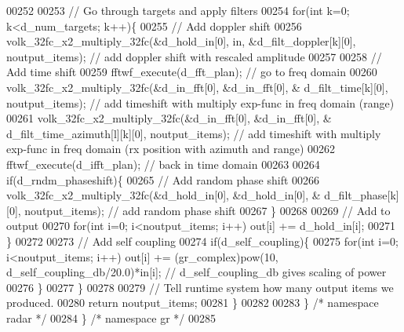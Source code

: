 \begin{DoxyCode}
00252 
00253             \textcolor{comment}{// Go through targets and apply filters}
00254             \textcolor{keywordflow}{for}(\textcolor{keywordtype}{int} k=0; k<d_num_targets; k++)\{
00255                 \textcolor{comment}{// Add doppler shift}
00256                 volk\_32fc\_x2\_multiply\_32fc(&d_hold_in[0], in, &d_filt_doppler[k][0], noutput\_items); \textcolor{comment}{// add
       doppler shift with rescaled amplitude}
00257 
00258                 \textcolor{comment}{// Add time shift}
00259                 fftwf\_execute(d_fft_plan); \textcolor{comment}{// go to freq domain}
00260                 volk\_32fc\_x2\_multiply\_32fc(&d_in_fft[0], &d_in_fft[0], &
      d_filt_time[k][0], noutput\_items); \textcolor{comment}{// add timeshift with multiply exp-func in freq domain (range)}
00261                 volk\_32fc\_x2\_multiply\_32fc(&d_in_fft[0], &d_in_fft[0], &
      d_filt_time_azimuth[l][k][0], noutput\_items); \textcolor{comment}{// add timeshift with multiply exp-func in freq domain (rx
       position with azimuth and range)}
00262                 fftwf\_execute(d_ifft_plan); \textcolor{comment}{// back in time domain}
00263 
00264                 \textcolor{keywordflow}{if}(d_rndm_phaseshift)\{
00265                     \textcolor{comment}{// Add random phase shift}
00266                     volk\_32fc\_x2\_multiply\_32fc(&d_hold_in[0], &d_hold_in[0], &
      d_filt_phase[k][0], noutput\_items); \textcolor{comment}{// add random phase shift}
00267                 \}
00268 
00269                 \textcolor{comment}{// Add to output}
00270                 \textcolor{keywordflow}{for}(\textcolor{keywordtype}{int} i=0; i<noutput\_items; i++) out[i] += d_hold_in[i];
00271             \}
00272 
00273             \textcolor{comment}{// Add self coupling}
00274             \textcolor{keywordflow}{if}(d_self_coupling)\{
00275                 \textcolor{keywordflow}{for}(\textcolor{keywordtype}{int} i=0; i<noutput\_items; i++) out[i] += (gr\_complex)pow(10,
      d_self_coupling_db/20.0)*in[i]; \textcolor{comment}{// d\_self\_coupling\_db gives scaling of power}
00276             \}
00277         \}
00278 
00279         \textcolor{comment}{// Tell runtime system how many output items we produced.}
00280         \textcolor{keywordflow}{return} noutput\_items;
00281     \}
00282 
00283   \} \textcolor{comment}{/* namespace radar */}
00284 \} \textcolor{comment}{/* namespace gr */}
00285 
\end{DoxyCode}

